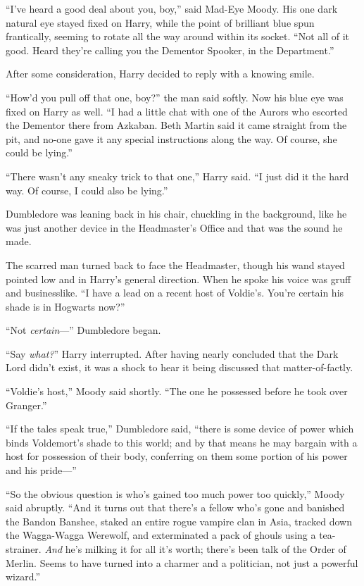 “I’ve heard a good deal about you, boy,” said Mad-Eye Moody. His one dark natural eye stayed fixed on Harry, while the point of brilliant blue spun frantically, seeming to rotate all the way around within its socket. “Not all of it good. Heard they’re calling you the Dementor Spooker, in the Department.”

After some consideration, Harry decided to reply with a knowing smile.

“How’d you pull off that one, boy?” the man said softly. Now his blue eye was fixed on Harry as well. “I had a little chat with one of the Aurors who escorted the Dementor there from Azkaban. Beth Martin said it came straight from the pit, and no-one gave it any special instructions along the way. Of course, she could be lying.”

“There wasn’t any sneaky trick to that one,” Harry said. “I just did it the hard way. Of course, I could also be lying.”

Dumbledore was leaning back in his chair, chuckling in the background, like he was just another device in the Headmaster’s Office and that was the sound he made.

The scarred man turned back to face the Headmaster, though his wand stayed pointed low and in Harry’s general direction. When he spoke his voice was gruff and businesslike. “I have a lead on a recent host of Voldie’s. You’re certain his shade is in Hogwarts now?”

“Not \emph{certain}—” Dumbledore began.

“Say \emph{what?}” Harry interrupted. After having nearly concluded that the Dark Lord didn’t exist, it was a shock to hear it being discussed that matter-of-factly.

“Voldie’s host,” Moody said shortly. “The one he possessed before he took over Granger.”

“If the tales speak true,” Dumbledore said, “there is some device of power which binds Voldemort’s shade to this world; and by that means he may bargain with a host for possession of their body, conferring on them some portion of his power and his pride—”

“So the obvious question is who’s gained too much power too quickly,” Moody said abruptly. “And it turns out that there’s a fellow who’s gone and banished the Bandon Banshee, staked an entire rogue vampire clan in Asia, tracked down the Wagga-Wagga Werewolf, and exterminated a pack of ghouls using a tea-strainer. \emph{And} he’s milking it for all it’s worth; there’s been talk of the Order of Merlin. Seems to have turned into a charmer and a politician, not just a powerful wizard.”

